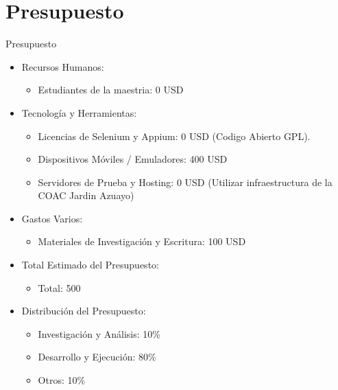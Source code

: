 \documentclass{beamer}
\begin{document}
\section{Presupuesto}
\begin{frame}{Presupuesto}
 \begin{itemize}
    \item Recursos Humanos:

    \begin{itemize}
          \item Estudiantes de la maestria: 0 USD 
    \end{itemize}
    \item Tecnología y Herramientas:

    \begin{itemize}
          \item Licencias de Selenium y Appium: 0 USD (Codigo Abierto GPL).
          \item Dispositivos Móviles / Emuladores: 400 USD

          \item Servidores de Prueba y Hosting: 0 USD (Utilizar infraestructura de la COAC Jardin Azuayo)
    \end{itemize}

    \item Gastos Varios:

    \begin{itemize}
          \item Materiales de Investigación y Escritura: 100 USD
    \end{itemize}

    \item Total Estimado del Presupuesto:

    \begin{itemize}
          \item Total: 500
    \end{itemize}


    \item Distribución del Presupuesto:

    \begin{itemize}
          \item Investigación y Análisis: 10\%
          \item Desarrollo y Ejecución: 80\%
          \item Otros: 10\%
    \end{itemize}
 
\end{itemize}
    
\end{frame}
\end{document}
